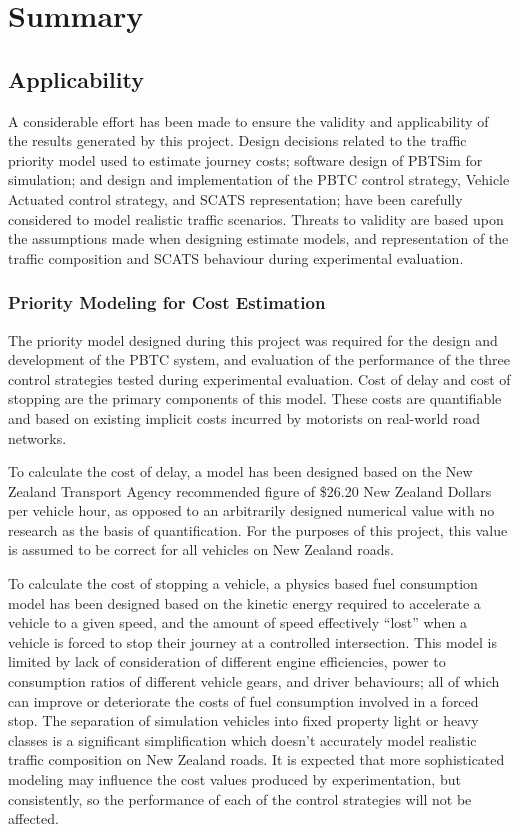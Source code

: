 \chapter{Summary}

\section{Applicability}

A considerable effort has been made to ensure the validity and applicability of the results generated by this project. Design decisions related to the traffic priority model used to estimate journey costs; software design of PBTSim for simulation; and design and implementation of the PBTC control strategy, Vehicle Actuated control strategy, and SCATS representation; have been carefully considered to model realistic traffic scenarios. Threats to validity are based upon the assumptions made when designing estimate models, and representation of the traffic composition and SCATS behaviour during experimental evaluation.

\subsection{Priority Modeling for Cost Estimation}

The priority model designed during this project was required for the design and development of the PBTC system, and evaluation of the performance of the three control strategies tested during experimental evaluation. Cost of delay and cost of stopping are the primary components of this model. These costs are quantifiable and based on existing implicit costs incurred by motorists on real-world road networks. 

To calculate the cost of delay, a model has been designed based on the New Zealand Transport Agency recommended figure of \$26.20 New Zealand Dollars per vehicle hour, as opposed to an arbitrarily designed numerical value with no research as the basis of quantification. For the purposes of this project, this value is assumed to be correct for all vehicles on New Zealand roads. 

To calculate the cost of stopping a vehicle, a physics based fuel consumption model has been designed based on the kinetic energy required to accelerate a vehicle to a given speed, and the amount of speed effectively ``lost'' when a vehicle is forced to stop their journey at a controlled intersection. This model is limited by lack of consideration of different engine efficiencies, power to consumption ratios of different vehicle gears, and driver behaviours; all of which can improve or deteriorate the costs of fuel consumption involved in a forced stop. The separation of simulation vehicles into fixed property light or heavy classes is a significant simplification which doesn't accurately model realistic traffic composition on New Zealand roads. It is expected that more sophisticated modeling may influence the cost values produced by experimentation, but consistently, so the performance of each of the control strategies will not be affected.

